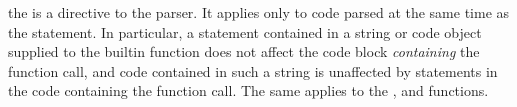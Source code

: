 the  is a directive to the parser.  It
applies only to code parsed at the same time as the 
statement.  In particular, a  statement contained in a
string or code object supplied to the builtin  function
does not affect the code block \emph{containing} the function call,
and code contained in such a string is unaffected by 
statements in the code containing the function call.  The same applies to the
,  and  functions.

